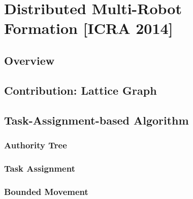 \documentclass[10pt]{beamer}
\begin{document}




\section{Distributed Multi-Robot Formation [ICRA 2014]}
\subsection[Overview]{Overview}







\subsection[Lattice Graph]{Contribution: Lattice Graph}








\subsection[Algorithm2]{Task-Assignment-based Algorithm}



\subsubsection[Algorithm2: Authority]{Authority Tree}





\subsubsection[Algorithm2: Task Assignment]{Task Assignment}






\subsubsection[Algorithm2: Motion Strategy]{Bounded Movement}
\end{document}
